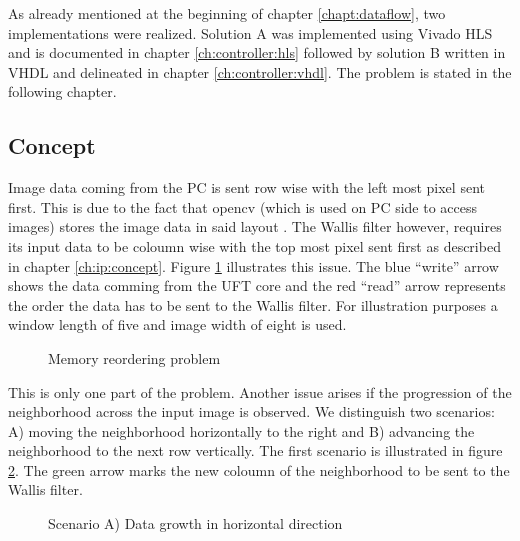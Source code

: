 As already mentioned at the beginning of chapter \ref{chapt:dataflow}, two
implementations were realized. Solution A was implemented using Vivado HLS and
is documented in chapter \ref{ch:controller:hls} followed by solution B written
in VHDL and delineated in chapter \ref{ch:controller:vhdl}. The problem is
stated in the following chapter.

\subsection{Concept} \label{ch:control:concept}
Image data coming from the PC is sent row wise with the left most pixel sent
first. This is due to the fact that \gls{opencv} (which is used on PC
side to access
images) stores the image data in said layout \cite{opencv_structures}. The
Wallis filter however, requires its input data to be coloumn wise with the top
most pixel sent first as described in chapter \ref{ch:ip:concept}. Figure 
\ref{fig:memproblem} illustrates this issue. The blue ``write'' arrow shows the data
comming from the UFT core and the red ``read'' arrow represents the order the
data has to be sent to the Wallis filter. For illustration purposes a window
length of five and image width of eight is used.

\begin{figure}[H]
    \centering
    \begin{adjustbox}{scale=0.7}
        
    \end{adjustbox}
    \caption{Memory reordering problem}
    \label{fig:memproblem}
\end{figure}

This is only one part of the problem. Another issue arises if the
progression of the neighborhood across the input image is observed. We
distinguish two scenarios: A) moving the neighborhood horizontally to the right
and B) advancing the neighborhood to the next row vertically. The first
scenario is illustrated in figure \ref{fig:memproblemgrowthx}. The green arrow
marks the new coloumn of the neighborhood to be sent to the Wallis filter.

\begin{figure}[H]
    \centering
    \begin{adjustbox}{scale=0.7}
        
    \end{adjustbox}
    \caption{Scenario A) Data growth in horizontal direction}
    \label{fig:memproblemgrowthx}
\end{figure}

